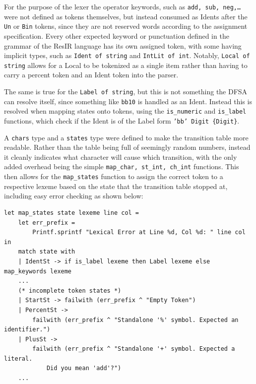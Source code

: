 \documentclass[11pt, a4paper]{article}
\begin{document}
\medskip

For the purpose of the lexer the operator keywords, such as \texttt{add, sub, neg,\dots}
were not defined as tokens themselves, but instead consumed as Idents after the \texttt{Un} or 
\texttt{Bin} tokens, since they are not reserved words according to the assignment specification. 
Every other expected keyword or punctuation defined in the grammar of the ResIR language has its own assigned token, with some having implicit types, 
such as \texttt{Ident of string} and \texttt{IntLit of int}. Notably, \texttt{Local of string} allows
for a Local to be tokenized as a single item rather than having to carry a percent token and an Ident token into the parser.

\medskip

The same is true for the \texttt{Label of string}, but this is not something the DFSA can resolve itself, 
since something like \texttt{bb10} is handled as an Ident. Instead this is resolved when mapping states onto tokens,
using the \texttt{is\_numeric} and \texttt{is\_label} functions, which check if the Ident is of the Label
form \texttt{'bb' Digit \{Digit\}}.

\medskip

A \texttt{chars} type and a \texttt{states} type were defined to make the transition table more readable.
Rather than the table being full of seemingly random numbers, instead it cleanly indicates what character
will cause which transition, with the only added overhead being the simple \texttt{map\_char, st\_int, ch\_int}
functions. This then allows for the \texttt{map\_states} function to assign the correct token to a respective lexeme
based on the state that the transition table stopped at, including easy error checking as shown below:

\medskip

\begin{lstlisting}[language={[Objective]Caml}]
let map_states state lexeme line col = 
    let err_prefix = 
        Printf.sprintf "Lexical Error at Line %d, Col %d: " line col in
    match state with 
    | IdentSt -> if is_label lexeme then Label lexeme else map_keywords lexeme
    ...
    (* incomplete token states *)
    | StartSt -> failwith (err_prefix ^ "Empty Token")
    | PercentSt -> 
        failwith (err_prefix ^ "Standalone '%' symbol. Expected an identifier.")
    | PlusSt -> 
        failwith (err_prefix ^ "Standalone '+' symbol. Expected a literal. 
            Did you mean 'add'?")
    ...
\end{lstlisting}
\end{document}
